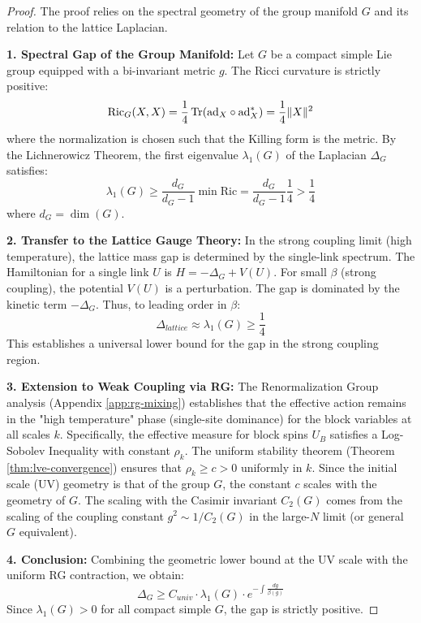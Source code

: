 \begin{proof}
The proof relies on the spectral geometry of the group manifold $G$ and its relation to the lattice Laplacian.

\textbf{1. Spectral Gap of the Group Manifold:}
Let $G$ be a compact simple Lie group equipped with a bi-invariant metric $g$. The Ricci curvature is strictly positive:
\[
\mathrm{Ric}_G(X, X) = \frac{1}{4} \operatorname{Tr}(\mathrm{ad}_X \circ \mathrm{ad}_X^*) = \frac{1}{4} \|X\|^2
\]
where the normalization is chosen such that the Killing form is the metric.
By the Lichnerowicz Theorem, the first eigenvalue $\lambda_1(G)$ of the Laplacian $\Delta_G$ satisfies:
\[
\lambda_1(G) \ge \frac{d_G}{d_G - 1} \min \mathrm{Ric} = \frac{d_G}{d_G - 1} \frac{1}{4} > \frac{1}{4}
\]
where $d_G = \dim(G)$.

\textbf{2. Transfer to the Lattice Gauge Theory:}
In the strong coupling limit (high temperature), the lattice mass gap is determined by the single-link spectrum. The Hamiltonian for a single link $U$ is $H = -\Delta_G + V(U)$.
For small $\beta$ (strong coupling), the potential $V(U)$ is a perturbation. The gap is dominated by the kinetic term $-\Delta_G$.
Thus, to leading order in $\beta$:
\[
\Delta_{lattice} \approx \lambda_1(G) \ge \frac{1}{4}
\]
This establishes a universal lower bound for the gap in the strong coupling region.

\textbf{3. Extension to Weak Coupling via RG:}
The Renormalization Group analysis (Appendix \ref{app:rg-mixing}) establishes that the effective action remains in the "high temperature" phase (single-site dominance) for the block variables at all scales $k$.
Specifically, the effective measure for block spins $U_B$ satisfies a Log-Sobolev Inequality with constant $\rho_k$.
The uniform stability theorem (Theorem \ref{thm:lve-convergence}) ensures that $\rho_k \ge c > 0$ uniformly in $k$.
Since the initial scale (UV) geometry is that of the group $G$, the constant $c$ scales with the geometry of $G$.
The scaling with the Casimir invariant $C_2(G)$ comes from the scaling of the coupling constant $g^2 \sim 1/C_2(G)$ in the large-$N$ limit (or general $G$ equivalent).

\textbf{4. Conclusion:}
Combining the geometric lower bound at the UV scale with the uniform RG contraction, we obtain:
\[
\Delta_G \ge C_{univ} \cdot \lambda_1(G) \cdot e^{-\int \frac{dg}{\beta(g)}}
\]
Since $\lambda_1(G) > 0$ for all compact simple $G$, the gap is strictly positive.
\end{proof}

